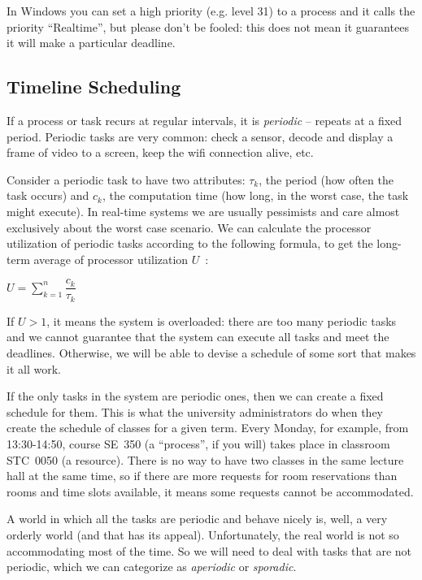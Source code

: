 In Windows you can set a high priority (e.g. level 31) to a process and it calls the priority ``Realtime'', but please don't be fooled: this does not mean it guarantees it will make a particular deadline.

\subsection*{Timeline Scheduling}
If a process or task recurs at regular intervals, it is \textit{periodic} -- repeats at a fixed period. Periodic tasks are very common: check a sensor, decode and display a frame of video to a screen, keep the wifi connection alive, etc.

Consider a periodic task to have two attributes: $\tau_{k}$, the period (how often the task occurs) and $c_{k}$, the computation time (how long, in the worst case, the task might execute). In real-time systems we are usually pessimists and care almost exclusively about the worst case scenario. We can calculate the processor utilization of periodic tasks according to the following formula, to get the long-term average of processor utilization $U$~\cite{mte241}:

\begin{center}
$U = \sum\limits_{k=1}^n\dfrac{c_{k}}{\tau_{k}}$
\end{center}

If $U > 1$, it means the system is overloaded: there are too many periodic tasks and we cannot guarantee that the system can execute all tasks and meet the deadlines. Otherwise, we will be able to devise a schedule of some sort that makes it all work.

If the only tasks in the system are periodic ones, then we can create a fixed schedule for them. This is what the university administrators do when they create the schedule of classes for a given term. Every Monday, for example, from 13:30-14:50, course SE~350 (a ``process'', if you will) takes place in classroom STC~0050 (a resource). There is no way to have two classes in the same lecture hall at the same time, so if there are more requests for room reservations than rooms and time slots available, it means some requests cannot be accommodated.

A world in which all the tasks are periodic and behave nicely is, well, a very orderly world (and that has its appeal). Unfortunately, the real world is not so accommodating most of the time. So we will need to deal with tasks that are not periodic, which we can categorize as \textit{aperiodic} or \textit{sporadic}.

